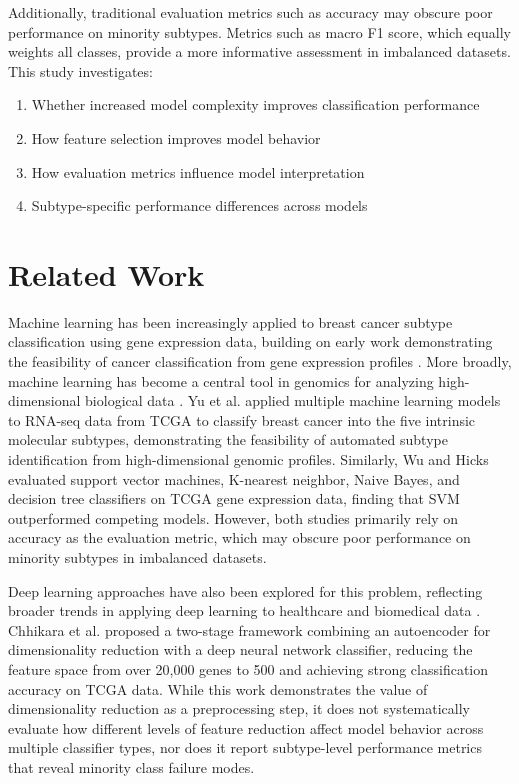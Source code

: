 \documentclass[10pt,twocolumn,letterpaper]{article}
\begin{document}
Additionally, traditional evaluation metrics such as accuracy may obscure poor performance on minority subtypes. Metrics such as macro F1 score, which equally weights all classes, provide a more informative assessment in imbalanced datasets. This study investigates:
\vspace{-0.2cm}
\begin{enumerate}
\setlength{\itemsep}{0pt}
\setlength{\parskip}{0pt}
\setlength{\parsep}{0pt}
    \item Whether increased model complexity improves classification performance
    \item How feature selection improves model behavior
    \item How evaluation metrics influence model interpretation
    \item Subtype-specific performance differences across models
\end{enumerate}

\FloatBarrier
\section{Related Work}

Machine learning has been increasingly applied to breast cancer subtype classification using gene expression data, building on early work demonstrating the feasibility of cancer classification from gene expression profiles \cite{golub1999, statnikov2005}. More broadly, machine learning has become a central tool in genomics for analyzing high-dimensional biological data \cite{libbrecht2015}. Yu et al. \cite{yu2020} applied multiple machine learning models to RNA-seq data from TCGA to classify breast cancer into the five intrinsic molecular subtypes, demonstrating the feasibility of automated subtype identification from high-dimensional genomic profiles. Similarly, Wu and Hicks \cite{wu2021} evaluated support vector machines, K-nearest neighbor, Naive Bayes, and decision tree classifiers on TCGA gene expression data, finding that SVM outperformed competing models. However, both studies primarily rely on accuracy as the evaluation metric, which may obscure poor performance on minority subtypes in imbalanced datasets.

Deep learning approaches have also been explored for this problem, reflecting broader trends in applying deep learning to healthcare and biomedical data \cite{esteva2019}. Chhikara et al. \cite{chhikara2021} proposed a two-stage framework combining an autoencoder for dimensionality reduction with a deep neural network classifier, reducing the feature space from over 20,000 genes to 500 and achieving strong classification accuracy on TCGA data. While this work demonstrates the value of dimensionality reduction as a preprocessing step, it does not systematically evaluate how different levels of feature reduction affect model behavior across multiple classifier types, nor does it report subtype-level performance metrics that reveal minority class failure modes.
\end{document}
